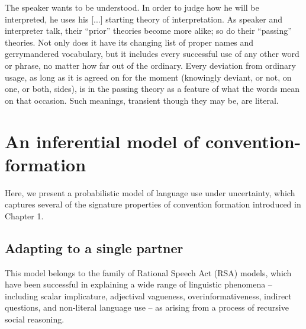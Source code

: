\begin{savequote}[125mm]
    The speaker wants to be understood. %
    In order to judge how he will be interpreted, he uses his [...] starting theory of interpretation. %
As speaker and interpreter talk, their ``prior'' theories become more alike; so do their ``passing'' theories. %
Not only does it have its changing list of proper names and gerrymandered vocabulary, but it includes every successful use of any other word or phrase, no matter how far out of the ordinary. 
Every deviation from ordinary usage, as long as it is agreed on for the moment (knowingly deviant, or not, on one, or both, sides), is in the passing theory as a feature of what the words mean on that occasion. 
Such meanings, transient though they may be, are literal.
\end{savequote}

\chapter{An inferential model of convention-formation}
\graphicspath{{./figures/modeling/}}

Here, we present a probabilistic model of language use under uncertainty, which captures several of the signature properties of convention formation introduced in Chapter 1. 

\section{Adapting to a single partner}
This model belongs to the family of Rational Speech Act (RSA) models, which have been successful in explaining a wide range of linguistic phenomena -- including scalar implicature, adjectival vagueness, overinformativeness, indirect questions, and non-literal language use -- as arising from a process of recursive social reasoning. 

